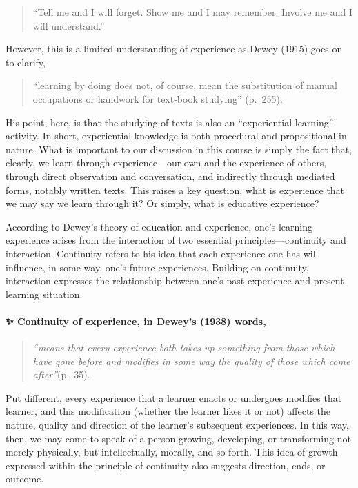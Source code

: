 \documentclass[
]{book}
\begin{document}
\begin{quote}
``Tell me and I will forget. Show me and I may remember. Involve me and I will understand.''
\end{quote}

However, this is a limited understanding of experience as Dewey (1915) goes on to clarify,

\begin{quote}
``learning by doing does not, of course, mean the substitution of manual occupations or handwork for text-book studying'' (p.~255).
\end{quote}

His point, here, is that the studying of texts is also an ``experiential learning'' activity. In short, experiential knowledge is both procedural and propositional in nature. What is important to our discussion in this course is simply the fact that, clearly, we learn through experience---our own and the experience of others, through direct observation and conversation, and indirectly through mediated forms, notably written texts. This raises a key question, what is experience that we may say we learn through it? Or simply, what is educative experience?

According to Dewey's theory of education and experience, one's learning experience arises from the interaction of two essential principles---continuity and interaction. Continuity refers to his idea that each experience one has will influence, in some way, one's future experiences. Building on continuity, interaction expresses the relationship between one's past experience and present learning situation.

\begin{protip}
\hypertarget{continuity-of-experience-in-deweys-1938-words}{%
\paragraph{✨ Continuity of experience, in Dewey's (1938)
words,}\label{continuity-of-experience-in-deweys-1938-words}}

\begin{quote}
\emph{``means that every experience both takes up something from those
which have gone before and modifies in some way the quality of those
which come after''}(p.~35).
\end{quote}
\end{protip}

Put different, every experience that a learner enacts or undergoes modifies that learner, and this modification (whether the learner likes it or not) affects the nature, quality and direction of the learner's subsequent experiences. In this way, then, we may come to speak of a person growing, developing, or transforming not merely physically, but intellectually, morally, and so forth. This idea of growth expressed within the principle of continuity also suggests direction, ends, or outcome.
\end{document}
